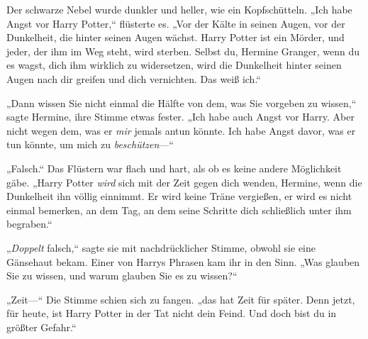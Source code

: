 Der schwarze Nebel wurde dunkler und heller, wie ein Kopfschütteln. „Ich habe Angst vor Harry Potter,“ flüsterte es. „Vor der Kälte in seinen Augen, vor der Dunkelheit, die hinter seinen Augen wächst. Harry Potter ist ein Mörder, und jeder, der ihm im Weg steht, wird sterben. Selbst du, Hermine Granger, wenn du es wagst, dich ihm wirklich zu widersetzen, wird die Dunkelheit hinter seinen Augen nach dir greifen und dich vernichten. Das weiß ich.“

„Dann wissen Sie nicht einmal die Hälfte von dem, was Sie vorgeben zu wissen,“ sagte Hermine, ihre Stimme etwas fester. „Ich habe auch Angst vor Harry. Aber nicht wegen dem, was er \emph{mir} jemals antun könnte. Ich habe Angst davor, was er tun könnte, um mich zu \emph{beschützen}—“

„Falsch.“ Das Flüstern war flach und hart, als ob es keine andere Möglichkeit gäbe. „Harry Potter \emph{wird} sich mit der Zeit gegen dich wenden, Hermine, wenn die Dunkelheit ihn völlig einnimmt. Er wird keine Träne vergießen, er wird es nicht einmal bemerken, an dem Tag, an dem seine Schritte dich schließlich unter ihm begraben.“

„\emph{Doppelt} falsch,“ sagte sie mit nachdrücklicher Stimme, obwohl sie eine Gänsehaut bekam. Einer von Harrys Phrasen kam ihr in den Sinn. „Was glauben Sie zu wissen, und warum glauben Sie es zu wissen?“

„Zeit—“ Die Stimme schien sich zu fangen. „das hat Zeit für später. Denn jetzt, für heute, ist Harry Potter in der Tat nicht dein Feind. Und doch bist du in größter Gefahr.“

